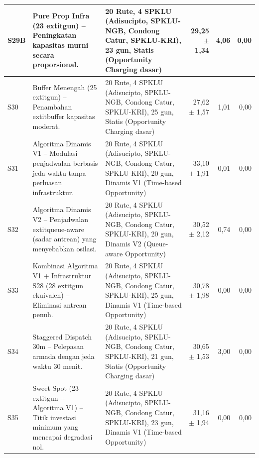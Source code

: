 \begin{center}
\begin{longtable}{|l|p{2.5cm}|p{2.5cm}|r|r|r|}
S29B & Pure Prop Infra (23 	extit{gun}) -- Peningkatan kapasitas murni secara proporsional. & 20 Rute, 4 SPKLU (Adisucipto, SPKLU-NGB, Condong Catur, SPKLU-KRI), 23 gun, Statis (Opportunity Charging dasar) & 29,25 $\pm$ 1,34 & 4,06 & 0,00 \\ \hline
S30 & Buffer Menengah (25 	extit{gun}) -- Penambahan 	extit{buffer} kapasitas moderat. & 20 Rute, 4 SPKLU (Adisucipto, SPKLU-NGB, Condong Catur, SPKLU-KRI), 25 gun, Statis (Opportunity Charging dasar) & 27,62 $\pm$ 1,57 & 1,01 & 0,00 \\ \hline
S31 & Algoritma Dinamis V1 -- Modulasi penjadwalan berbasis jeda waktu tanpa perluasan infrastruktur. & 20 Rute, 4 SPKLU (Adisucipto, SPKLU-NGB, Condong Catur, SPKLU-KRI), 20 gun, Dinamis V1 (Time-based Opportunity) & 33,10 $\pm$ 1,91 & 0,01 & 0,00 \\ \hline
S32 & Algoritma Dinamis V2 -- Penjadwalan 	extit{queue-aware} (sadar antrean) yang menyebabkan osilasi. & 20 Rute, 4 SPKLU (Adisucipto, SPKLU-NGB, Condong Catur, SPKLU-KRI), 20 gun, Dinamis V2 (Queue-aware Opportunity) & 30,52 $\pm$ 2,12 & 0,74 & 0,00 \\ \hline
S33 & Kombinasi Algoritma V1 + Infrastruktur S28 (28 	extit{gun} ekuivalen) -- Eliminasi antrean penuh. & 20 Rute, 4 SPKLU (Adisucipto, SPKLU-NGB, Condong Catur, SPKLU-KRI), 25 gun, Dinamis V1 (Time-based Opportunity) & 30,78 $\pm$ 1,98 & 0,00 & 0,00 \\ \hline
S34 & Staggered Dispatch 30m -- Pelepasan armada dengan jeda waktu 30 menit. & 20 Rute, 4 SPKLU (Adisucipto, SPKLU-NGB, Condong Catur, SPKLU-KRI), 21 gun, Statis (Opportunity Charging dasar) & 30,65 $\pm$ 1,53 & 3,00 & 0,00 \\ \hline
S35 & Sweet Spot (23 	extit{gun} + Algoritma V1) -- Titik investasi minimum yang mencapai degradasi nol. & 20 Rute, 4 SPKLU (Adisucipto, SPKLU-NGB, Condong Catur, SPKLU-KRI), 23 gun, Dinamis V1 (Time-based Opportunity) & 31,16 $\pm$ 1,94 & 0,00 & 0,00 \\ \hline
\end{longtable}
\end{center}
